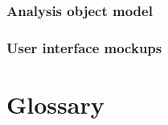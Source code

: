 \documentclass[a4paper,12pt]{article}
\begin{document}
 \subsubsection{Analysis object model}

 \subsubsection{User interface mockups}



 \section{Glossary}



 
\end{document}
